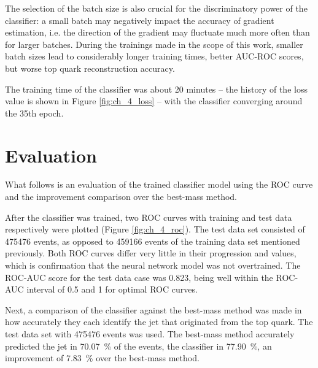 The selection of the batch size is also crucial for the discriminatory power of the classifier: a small batch may negatively impact the accuracy of gradient estimation, i.e. the direction of the gradient may fluctuate much more often than for larger batches. During the trainings made in the scope of this work, smaller batch sizes lead to considerably longer training times, better AUC-ROC scores, but worse top quark reconstruction accuracy.

The training time of the classifier was about 20 minutes -- the history of the loss value is shown in Figure \ref{fig:ch_4_loss} -- with the classifier converging around the 35th epoch.

\section{Evaluation}
\label{sec:ch-4-eval}
What follows is an evaluation of the trained classifier model using the ROC curve and the improvement comparison over the best-mass method.

After the classifier was trained, two ROC curves with training and test data respectively were plotted (Figure \ref{fig:ch_4_roc}). The test data set consisted of \num{475476} events, as opposed to \num{459166} events of the training data set mentioned previously. Both ROC curves differ very little in their progression and values, which is confirmation that the neural network model was not overtrained. The ROC-AUC score for the test data case was 0.823, being well within the ROC-AUC interval of 0.5 and 1 for optimal ROC curves.

Next, a comparison of the classifier against the best-mass method was made in how accurately they each identify the jet that originated from the top quark. The test data set with \num{475476} events was used. The best-mass method accurately predicted the jet in \SI{70.07}{\%} of the events, the classifier in \SI{77.90}{\%}, an improvement of \SI{7.83}{\%} over the best-mass method.

